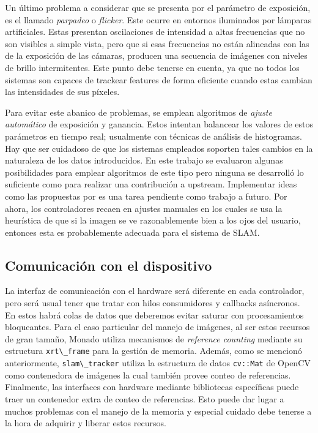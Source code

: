 \documentclass[ twoside,openright,titlepage,numbers=noenddot,%
                headinclude,footinclude,cleardoublepage=empty,abstract=on,
                BCOR=-5mm,paper=a4,fontsize=11pt
                ]{scrreprt}
\newcommand{\passthrough}[1]{#1}
\begin{document}
Un último problema a considerar que se presenta por el parámetro de
exposición, es el llamado \emph{parpadeo} o \emph{flicker}. Este ocurre
en entornos iluminados por lámparas artificiales. Estas presentan
oscilaciones de intensidad a altas frecuencias que no son visibles a
simple vista, pero que si esas frecuencias no están alineadas con las de
la exposición de las cámaras, producen una secuencia de imágenes con
niveles de brillo intermitentes. Este punto debe tenerse en cuenta, ya
que no todos los sistemas son capaces de trackear features de forma
eficiente cuando estas cambian las intensidades de sus píxeles.

Para evitar este abanico de problemas, se emplean algoritmos de
\emph{ajuste automático} de exposición y ganancia. Estos intentan
balancear los valores de estos parámetros en tiempo real; usualmente con
técnicas de análisis de histogramas. Hay que ser cuidadoso de que los
sistemas empleados soporten tales cambios en la naturaleza de los datos
introducidos. En este trabajo se evaluaron algunas posibilidades para
emplear algoritmos de este tipo pero ninguna se desarrolló lo suficiente
como para realizar una contribución a upstream. Implementar ideas como
las propuestas por \textcite{zhangActiveExposureControl2017} es una
tarea pendiente como trabajo a futuro. Por ahora, los controladores
recaen en ajustes manuales en los cuales se usa la heurística de que si
la imagen se ve razonablemente bien a los ojos del usuario, entonces
esta es probablemente adecuada para el sistema de SLAM.

\hypertarget{comunicaciuxf3n-con-el-dispositivo}{%
\subsection{Comunicación con el
dispositivo}\label{comunicaciuxf3n-con-el-dispositivo}}

La interfaz de comunicación con el hardware será diferente en cada
controlador, pero será usual tener que tratar con hilos consumidores y
callbacks asíncronos. En estos habrá colas de datos que deberemos evitar
saturar con procesamientos bloqueantes. Para el caso particular del
manejo de imágenes, al ser estos recursos de gran tamaño, Monado utiliza
mecanismos de \emph{reference counting} mediante su estructura
\passthrough{\lstinline!xrt\_frame!} para la gestión de memoria. Además,
como se mencionó anteriormente, \passthrough{\lstinline!slam\_tracker!}
utiliza la estructura de datos \passthrough{\lstinline!cv::Mat!} de
OpenCV como contenedora de imágenes la cual también provee conteo de
referencias. Finalmente, las interfaces con hardware mediante
bibliotecas específicas puede traer un contenedor extra de conteo de
referencias. Esto puede dar lugar a muchos problemas con el manejo de la
memoria y especial cuidado debe tenerse a la hora de adquirir y liberar
estos recursos.
\end{document}
